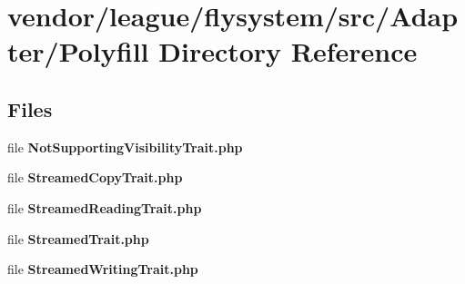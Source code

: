 \section{vendor/league/flysystem/src/\+Adapter/\+Polyfill Directory Reference}
\label{dir_b1cc80375080e11f75bb4fd698b478e7}
\subsection*{Files}
\begin{DoxyCompactItemize}
\item 
file {\bf Not\+Supporting\+Visibility\+Trait.\+php}
\item 
file {\bf Streamed\+Copy\+Trait.\+php}
\item 
file {\bf Streamed\+Reading\+Trait.\+php}
\item 
file {\bf Streamed\+Trait.\+php}
\item 
file {\bf Streamed\+Writing\+Trait.\+php}
\end{DoxyCompactItemize}
